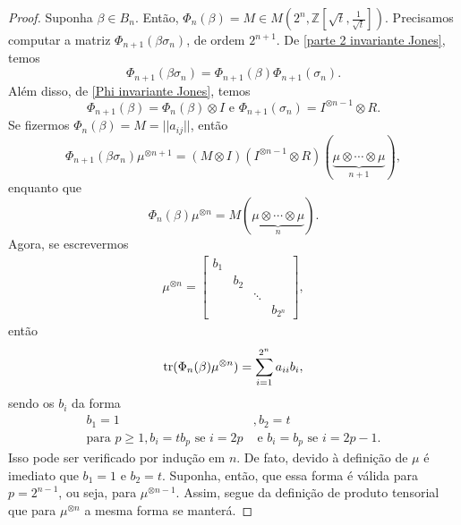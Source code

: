 \begin{proof}
		\par\vspace{0.3cm} Suponha $\beta\in B_n$. Então, 
		$\Phi_n(\beta) = M\in M(2^n, \mathbb{Z}[\sqrt{t}, \frac{1}{\sqrt{t}}])$. 
		Precisamos computar a matriz $\Phi_{n+1}(\beta\sigma_n)$, de ordem $2^{n+1}$. 
		De \eqref{parte 2 invariante Jones}, temos
		\begin{equation*}
		    \Phi_{n+1}(\beta\sigma_n) = \Phi_{n+1}(\beta)\Phi_{n+1}(\sigma_n).
		\end{equation*}
		Além disso, de \eqref{Phi invariante Jones}, temos
		\begin{equation*}
		    \Phi_{n+1}(\beta) 
		    = \Phi_n(\beta)\otimes I \text{ e }\Phi_{n+1}(\sigma_n) = I^{\otimes n-1}\otimes R.
		\end{equation*}
		Se fizermos $\Phi_n(\beta) = M = ||a_{ij}||$, então
		\begin{equation*}
		    \Phi_{n+1}(\beta\sigma_n)\mu^{\otimes n+1} 
		    = (M\otimes I)(I^{\otimes n-1}\otimes R)(\underbrace{\mu\otimes\cdots\otimes\mu}_{n+1}),
		\end{equation*}
		enquanto que
		\begin{equation*}
		    \Phi_n(\beta)\mu^{\otimes n} = M(\underbrace{\mu\otimes\cdots\otimes\mu}_{n}).
		\end{equation*}
		Agora, se escrevermos 
		\begin{align*}
    		\mu^{\otimes n} = \begin{bmatrix}
    		b_1 \\
    		& b_2 \\
    		& & \ddots \\
    		& & & b_{2^n}
    		\end{bmatrix},
		\end{align*}
		então
		\begin{equation*}
		    \operatorname{tr}(\Phi_n(\beta)\mu^{\otimes n}) = \sum_{i=1}^{2^n}a_{ii}b_i,
		\end{equation*}
		sendo os $b_i$ da forma
		\begin{align*}
		    b_1 = 1&, b_2 = t \\
		    \text{para }p\geq 1, b_i = tb_p \text{ se }i=2p &\text{ e } b_i = b_p \text{ se }i=2p-1.
		\end{align*}
		Isso pode ser verificado por indução em $n$. De fato, devido à definição de $\mu$ 
		é imediato que $b_1 = 1$ e $b_2 = t$. Suponha, então, que essa forma é válida para 
		$p = 2^{n-1}$, ou seja, para $\mu^{\otimes n-1 }$. Assim, segue da definição de 
		produto tensorial que para $\mu^{\otimes n}$ a mesma forma se manterá.
		

\end{proof}
